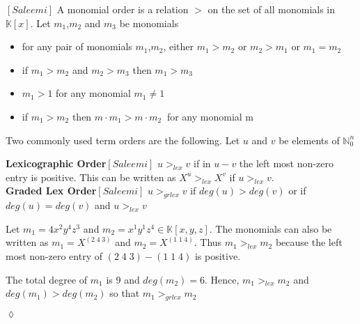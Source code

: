 \begin{env_definition} 
$\left[ Saleemi\right] $
A monomial order is a relation $>$ on the set of all monomials in $\mathbb{K}\left[x\right]$.
Let $m_{1}$,$m_{2}$ and $m_{3}$ be monomials
\begin{center}

\begin{itemize}

\item
for any pair of monomials $m_{1}$,$m_{2}$, either $m_{1} > m_{2}$ or $m_{2} > m_{1}$ or $m_{1} = m_{2}$ 
\item
if $m_{1} > m_{2} $ and $m_{2} > m_{3}$ then $m_{1} > m_{3}$
\item
$m_{1} > 1$ for any monomial $m_{1} \neq 1$
\item
if $m_{1} > m_{2}$ then $m \cdot m_{1} > m \cdot m_{2}~$ for any monomial m

\end{itemize}
 
\end{center}

\end{env_definition}


Two commonly used term orders are the following.
Let $u$ and $v$ be elements of $\mathbb{N}^{n}_{0}$ 

\textbf{Lexicographic Order}$\left[ Saleemi\right] $
$u >_{lex} v $ if in $u-v$ the left most non-zero entry is positive.
This can be written as $X^{u} >_{lex} X^{v}$ if $u >_{lex} v $.\\


\textbf{Graded Lex Order}$\left[ Saleemi\right] $
$u >_{grlex} v $ if $ deg(u)>deg(v)$ or if $ deg(u)=deg(v)$ and $u >_{lex} v$

\begin{env_example} \normalfont
Let $m_{1} = 4x^{2}y^{4}z^{3}$ and $m_{2}= x^{1}y^{1}z^{4} \in \mathbb{K}\left[ x,y,z\right]  $.
The monomials can also be written as $m_{1} = X^{(2 \; 4 \; 3)}$ and $m_{2} = X^{(1 \; 1 \; 4)}$.
Thus $m_{1}>_{lex} m_{2}$ because the left most non-zero entry of $ (2 \; 4 \; 3) - (1 \; 1 \; 4)$ is positive.

The total degree of $m_{1}$ is 9 and $deg(m_{2})=6$. Hence, $m_{1}>_{lex} m_{2}$ and
$deg(m_{1})>deg(m_{2})$ so that $m_{1}>_{grlex} m_{2}$ 
\begin{flushright}
$\lozenge$
\end{flushright}
\end{env_example}
  

